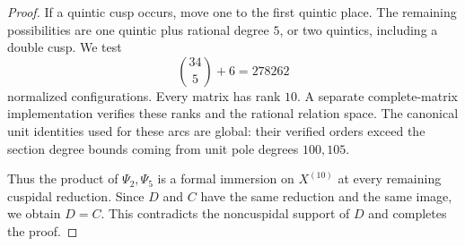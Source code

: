 \begin{proof}
If a quintic cusp occurs, move one to the first quintic place.
The remaining possibilities are one quintic plus rational degree
$5$, or two quintics, including a double cusp. We test
\[
                    \binom{34}{5}+6=278262
\]
normalized configurations. Every matrix has rank $10$.
A separate complete-matrix implementation verifies these ranks and
the rational relation space. The canonical unit identities used for
these arcs are global: their verified orders exceed the section
degree bounds coming from unit pole degrees $100,105$.

Thus the product of $\Psi_2,\Psi_5$ is a formal immersion on
$X^{(10)}$ at every remaining cuspidal reduction. Since $D$ and $C$
have the same reduction and the same image, we obtain $D=C$.
This contradicts the noncuspidal support of $D$ and completes the
proof.
\end{proof}
